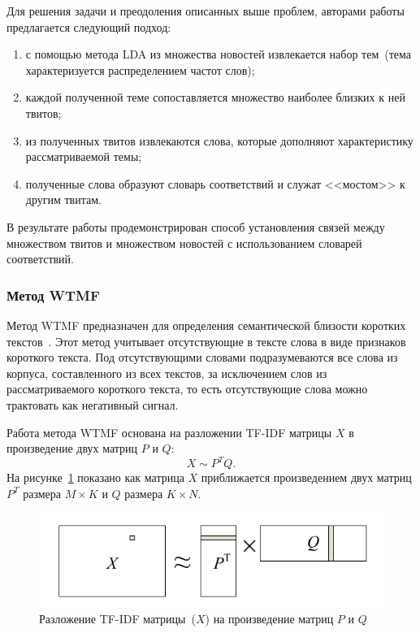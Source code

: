          Для решения задачи и преодоления описанных выше проблем, авторами работы предлагается следующий подход:
         \begin{enumerate}
            \item с помощью метода LDA из множества новостей извлекается набор тем~(тема характеризуется распределением частот слов);
            \item каждой полученной теме сопоставляется множество наиболее близких к ней твитов;
            \item из полученных твитов извлекаются слова, которые дополняют характеристику рассматриваемой темы;
            \item полученные слова образуют словарь соответствий и служат <<мостом>> к другим твитам.
         \end{enumerate}
         В результате работы продемонстрирован способ установления связей между множеством твитов и множеством новостей с использованием словарей соответствий.

    \subsubsection{Метод WTMF}
    \label{subsubsec:wtmf}
        Метод WTMF предназначен для определения семантической близости коротких текстов~\cite{wtmf}.
        Этот метод учитывает отсутствующие в тексте слова в виде признаков короткого текста.
        Под отсутствующими словами подразумеваются все слова из корпуса, составленного из всех текстов, за исключением слов из рассматриваемого короткого текста,
        то есть отсутствующие слова можно трактовать как негативный сигнал.

        Работа метода WTMF основана на разложении TF-IDF матрицы $X$ в произведение двух матриц $P$ и $Q$:
        \begin{equation}
            X \sim P^TQ.
        \end{equation}
        На рисунке~\ref{pic:wtmf} показано как матрица $X$ приближается произведением двух матриц $P^T$ размера $M \times K$ и $Q$ размера $K \times N$.

        \begin{figure}[h!]
            \center
            \includegraphics[scale=0.45]{wtmf.png}
            \caption{Разложение TF-IDF матрицы~($X$) на произведение матриц $P$ и $Q$}
            \label{pic:wtmf}
        \end{figure}

